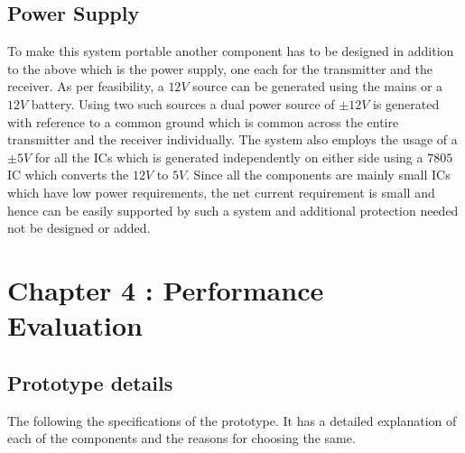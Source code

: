 \documentclass{article}
\begin{document}
\subsection{Power Supply}
To make this system portable another component has to be designed in addition to the above which is the power supply, one each for the transmitter and the receiver. As per feasibility, a $12 V$ source can be generated using the mains or a $12 V$ battery. Using two such sources a dual power source of $\pm 12 V$ is generated with reference to a common ground which is common across the entire transmitter and the receiver individually. The system also employs the usage of a $\pm 5V$ for all the ICs which is generated independently on either side using a $7805$ IC which converts the $12 V$ to $5 V$. Since all the components are mainly small ICs which have low power requirements, the net current requirement is small and hence can be easily supported by such a system and additional protection needed not be designed or added.





\section{Chapter 4 : Performance Evaluation}
\subsection{Prototype details}
The following the specifications of the prototype. It has a detailed explanation of each of the components and the reasons for choosing the same.
\end{document}
